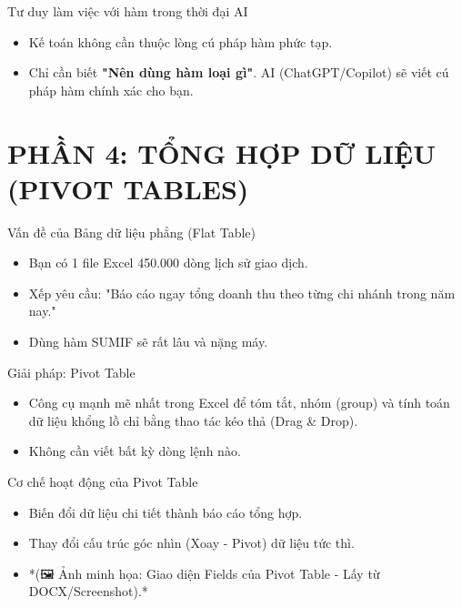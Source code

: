 \documentclass[aspectratio=169]{beamer}
\begin{document}
\begin{frame}{Tư duy làm việc với hàm trong thời đại AI}
    \begin{itemize}
        \item Kế toán không cần thuộc lòng cú pháp hàm phức tạp.
        \item Chỉ cần biết \textbf{"Nên dùng hàm loại gì"}. AI (ChatGPT/Copilot) sẽ viết cú pháp hàm chính xác cho bạn.
    \end{itemize}
\end{frame}


\section{PHẦN 4: TỔNG HỢP DỮ LIỆU (PIVOT TABLES)}


\begin{frame}{Vấn đề của Bảng dữ liệu phẳng (Flat Table)}
    \begin{itemize}
        \item Bạn có 1 file Excel 450.000 dòng lịch sử giao dịch.
        \item Xếp yêu cầu: "Báo cáo ngay tổng doanh thu theo từng chi nhánh trong năm nay."
        \item Dùng hàm SUMIF sẽ rất lâu và nặng máy.
    \end{itemize}
\end{frame}


\begin{frame}{Giải pháp: Pivot Table}
    \begin{itemize}
        \item Công cụ mạnh mẽ nhất trong Excel để tóm tắt, nhóm (group) và tính toán dữ liệu khổng lồ chỉ bằng thao tác kéo thả (Drag \& Drop).
        \item Không cần viết bất kỳ dòng lệnh nào.
    \end{itemize}
\end{frame}


\begin{frame}{Cơ chế hoạt động của Pivot Table}
    \begin{itemize}
        \item Biến đổi dữ liệu chi tiết thành báo cáo tổng hợp.
        \item Thay đổi cấu trúc góc nhìn (Xoay - Pivot) dữ liệu tức thì.
        \item *(🖼️ Ảnh minh họa: Giao diện Fields của Pivot Table - Lấy từ DOCX/Screenshot).*
    \end{itemize}
\end{frame}
\end{document}
